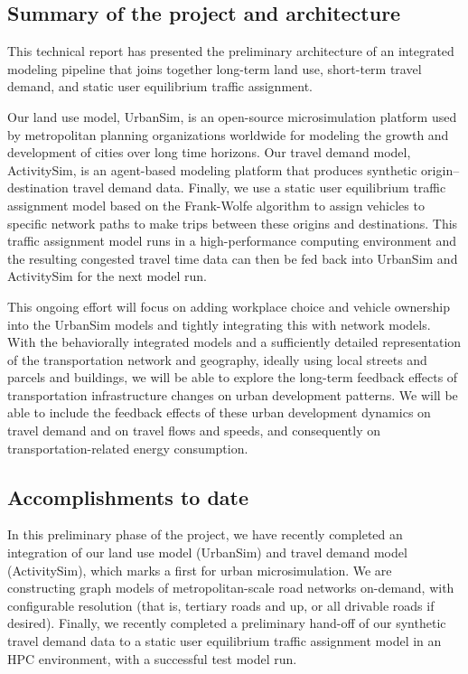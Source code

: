 \subsection{Summary of the project and architecture}

This technical report has presented the preliminary architecture of an integrated modeling pipeline that joins together long-term land use, short-term travel demand, and static user equilibrium traffic assignment.

Our land use model, UrbanSim, is an open-source microsimulation platform used by metropolitan planning organizations worldwide for modeling the growth and development of cities over long time horizons. Our travel demand model, ActivitySim, is an agent-based modeling platform that produces synthetic origin--destination travel demand data. Finally, we use a static user equilibrium traffic assignment model based on the Frank-Wolfe algorithm to assign vehicles to specific network paths to make trips between these origins and destinations. This traffic assignment model runs in a high-performance computing environment and the resulting congested travel time data can then be fed back into UrbanSim and ActivitySim for the next model run. 

This ongoing effort will focus on adding workplace choice and vehicle ownership into the UrbanSim models and tightly integrating this with network models. With the behaviorally integrated models and a sufficiently detailed representation of the transportation network and geography, ideally using local streets and parcels and buildings, we will be able to explore the long-term feedback effects of transportation infrastructure changes on urban development patterns. We will be able to include the feedback effects of these urban development dynamics on travel demand and on travel flows and speeds, and consequently on transportation-related energy consumption.

\subsection{Accomplishments to date}

In this preliminary phase of the project, we have recently completed an integration of our land use model (UrbanSim) and travel demand model (ActivitySim), which marks a first for urban microsimulation. We are constructing graph models of metropolitan-scale road networks on-demand, with configurable resolution (that is, tertiary roads and up, or all drivable roads if desired). Finally, we recently completed a preliminary hand-off of our synthetic travel demand data to a static user equilibrium traffic assignment model in an HPC environment, with a successful test model run.

